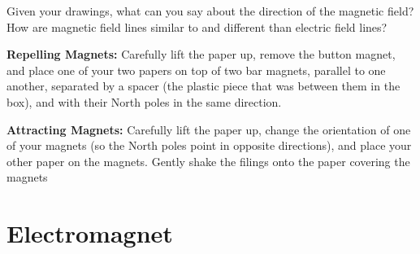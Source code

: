 \documentclass[10pt]{exam}
\begin{document}
\begin{questions}
  \vs[3]

\question Given your drawings, what can you say about the direction of the magnetic field?  How are magnetic field lines similar to and different than electric field lines?

  \vs



  \pagebreak



\question \textbf{Repelling Magnets:} Carefully lift the paper up, remove the button magnet, and place one of your two papers on top of two bar magnets, parallel to one another, separated by a spacer (the plastic piece that was between them in the box), and with their North poles in the same direction.


  \vs[3]

\question \textbf{Attracting Magnets:} Carefully lift the paper up, change the orientation of one of your magnets (so the North poles point in opposite directions), and place your other paper on the magnets. Gently shake the filings onto the paper covering the magnets



  \vs[3]


\end{questions}


\pagebreak

\section{Electromagnet}
\end{document}
